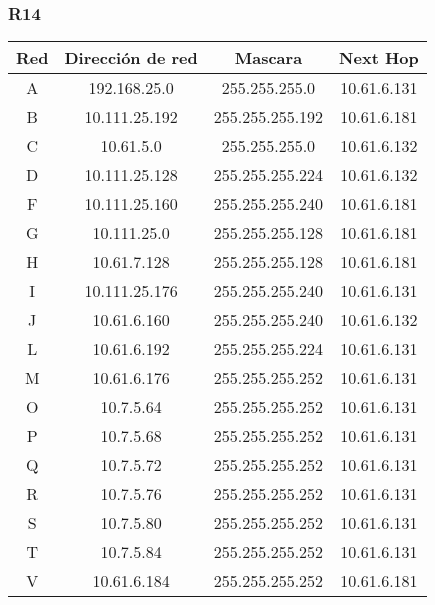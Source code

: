 \subsubsection{R14}
\begin{table}[!htbp]
\centering
  \begin{tabular}{|c|c|c|c|}
    \hline
	Red & Dirección de red & Mascara & Next Hop\\ \hline
	A & 192.168.25.0 & 255.255.255.0 & 10.61.6.131 \\ \hline
	B & 10.111.25.192 & 255.255.255.192 & 10.61.6.181 \\ \hline
	C & 10.61.5.0 & 255.255.255.0 & 10.61.6.132 \\ \hline
	D & 10.111.25.128 & 255.255.255.224 & 10.61.6.132 \\ \hline
	F & 10.111.25.160 & 255.255.255.240 & 10.61.6.181 \\ \hline
	G & 10.111.25.0 & 255.255.255.128 & 10.61.6.181 \\ \hline
	H & 10.61.7.128 & 255.255.255.128 & 10.61.6.181 \\ \hline
	I & 10.111.25.176 & 255.255.255.240 & 10.61.6.131 \\ \hline
	J & 10.61.6.160 & 255.255.255.240 & 10.61.6.132 \\ \hline
	L & 10.61.6.192 & 255.255.255.224 & 10.61.6.131 \\ \hline
	M & 10.61.6.176 & 255.255.255.252 & 10.61.6.131 \\ \hline
	O & 10.7.5.64 & 255.255.255.252 & 10.61.6.131 \\ \hline
	P & 10.7.5.68 & 255.255.255.252 & 10.61.6.131 \\ \hline
	Q & 10.7.5.72 & 255.255.255.252 & 10.61.6.131 \\ \hline
	R & 10.7.5.76 & 255.255.255.252 & 10.61.6.131 \\ \hline
	S & 10.7.5.80 & 255.255.255.252 & 10.61.6.131 \\ \hline
	T & 10.7.5.84 & 255.255.255.252 & 10.61.6.131 \\ \hline
	V & 10.61.6.184 & 255.255.255.252 & 10.61.6.181 \\
    \hline
  \end{tabular}
\end{table}

\newpage
